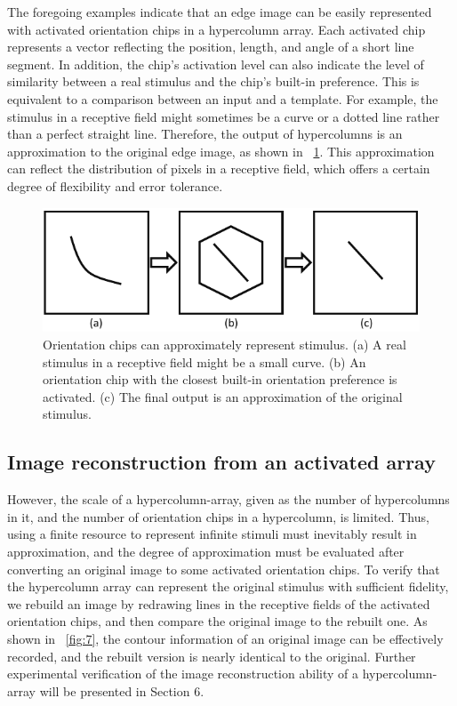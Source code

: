 \documentclass[journal]{IEEEtran}
\begin{document}
The foregoing examples indicate that an edge image can be easily represented with activated orientation chips in a hypercolumn array. 
Each activated chip represents a vector reflecting the position, length, and angle of a short line segment. 
In addition, the chip's activation level can also indicate the level of similarity between a real stimulus and the chip's built-in preference. 
This is equivalent to a comparison between an input and a template. 
For example, the stimulus in a receptive field might sometimes be a curve or a dotted line rather than a perfect straight line. 
Therefore, the output of hypercolumns is an approximation to the original edge image, 
as shown in \figurename~\ref{fig:6}. 
This approximation can reflect the distribution of pixels in a receptive field, which offers a certain degree of flexibility and error tolerance.

\begin{figure}[!t]
\centering
\includegraphics[width=0.75\linewidth]{images/fig6.pdf}
\caption{Orientation chips can approximately represent stimulus. 
(a) A real stimulus in a receptive field might be a small curve. 
(b) An orientation chip with the closest built-in orientation preference is activated. 
(c) The final output is an approximation of the original stimulus.}
\label{fig:6}
\end{figure}

\subsection{Image reconstruction from an activated array}

However, the scale of a hypercolumn-array, given as the number of hypercolumns in it, 
and the number of orientation chips in a hypercolumn, is limited. 
Thus, using a finite resource to represent infinite stimuli must inevitably result in approximation, 
and the degree of approximation must be evaluated after converting an original image to some activated orientation chips. 
To verify that the hypercolumn array can represent the original stimulus with sufficient fidelity, 
we rebuild an image by redrawing lines in the receptive fields of the activated orientation chips, 
and then compare the original image to the rebuilt one. 
As shown in \figurename~\ref{fig:7}, 
the contour information of an original image can be effectively recorded, 
and the rebuilt version is nearly identical to the original. 
Further experimental verification of the image reconstruction ability of a hypercolumn-array will be presented in Section 6.
\end{document}
